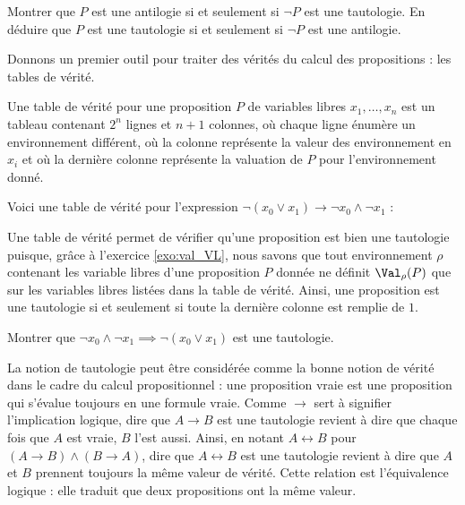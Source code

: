 \begin{exercise}
  Montrer que $P$ est une antilogie si et seulement si $\lnot P$ est une
  tautologie. En déduire que $P$ est une tautologie si et seulement si $\lnot P$
  est une antilogie.
\end{exercise}

Donnons un premier outil pour traiter des vérités du calcul des propositions :
les tables de vérité.

\begin{definition}
  Une table de vérité pour une proposition $P$ de variables libres
  $x_1,\ldots,x_n$ est un tableau contenant $2^n$ lignes et $n+1$ colonnes, où
  chaque ligne énumère un environnement différent, où la
   colonne représente la valeur des environnement en
  $x_i$ et où la dernière colonne représente la valuation de $P$ pour
  l'environnement donné.
\end{definition}

\begin{example}
  Voici une table de vérité pour l'expression
  $\lnot (x_0 \lor x_1)\to \lnot x_0 \land \lnot x_1$ :
\end{example}

Une table de vérité permet de vérifier qu'une proposition est bien une tautologie
puisque, grâce à l'exercice \ref{exo:val_VL}, nous savons que tout environnement
$\rho$ contenant les variable libres d'une proposition $P$ donnée ne définit
$\Val_\rho(P)$ que sur les variables libres listées dans la table de vérité.
Ainsi, une proposition est une tautologie si et seulement si toute la dernière
colonne est remplie de $1$.

\begin{exercise}
  Montrer que $\lnot x_0\land \lnot x_1 \implies \lnot (x_0\lor x_1)$ est une
  tautologie.
\end{exercise}

La notion de tautologie peut être considérée comme la bonne notion de vérité
dans le cadre du calcul propositionnel : une proposition vraie est une
proposition qui s'évalue toujours en une formule vraie. Comme $\to$ sert à
signifier l'implication logique, dire que $A \to B$ est une tautologie revient à
dire que chaque fois que $A$ est vraie, $B$ l'est aussi. Ainsi, en notant
$A \leftrightarrow B$ pour $(A \to B) \land (B \to A)$, dire que
$A \leftrightarrow B$ est une tautologie revient à dire que $A$ et $B$ prennent
toujours la même valeur de vérité. Cette relation est l'équivalence logique :
elle traduit que deux propositions ont la même valeur.

